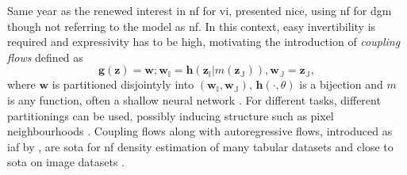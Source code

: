 \documentclass[12pt,fleqn,twocolumn]{article}
\begin{document}
Same year as the renewed interest in \acrshort{nf} for \acrshort{vi}, \textcite{Dinh2015NICENI} presented \acrfull{nice}, using \acrshort{nf} for \acrshort{dgm} though not referring to the model as \acrshort{nf}.
In this context, easy invertibility is required and expressivity has to be high, motivating the introduction of \emph{coupling flows} defined as
\begin{equation}
    \mathbf g(\mathbf z)  = \mathbf w; \mathbf w_{\mathbb I}=\mathbf h(\mathbf z_{\mathbb I} | m(\mathbf z_{\mathbb J})), \mathbf w_{\mathbb J} = \mathbf z_\mathbb J,
\end{equation}
where $\mathbf w$ is partitioned disjointyly into $(\mathbf w_\mathbb I, \mathbf w_\mathbb J)$, $\mathbf h(\cdot, \theta)$ is a bijection and $m$ is any function, often a shallow neural network \cite[Chap. 3]{Dinh2015NICENI}\cite[Chap. 3.4]{koby2021nf}.
For different tasks, different partitionings can be used, possibly inducing structure such as pixel neighbourhoods \cite[Chap. 3.4]{koby2021nf}. 
Coupling flows along with autoregressive flows, introduced as \acrfull{iaf} by \textcite{Kingma2017ImprovedVI}, are \acrfull{sota} for \acrshort{nf} density estimation of many tabular datasets \cite[Tab. 2]{koby2021nf} and close to \acrshort{sota} on image datasets \cite[Tab. 3]{koby2021nf}.
\end{document}
